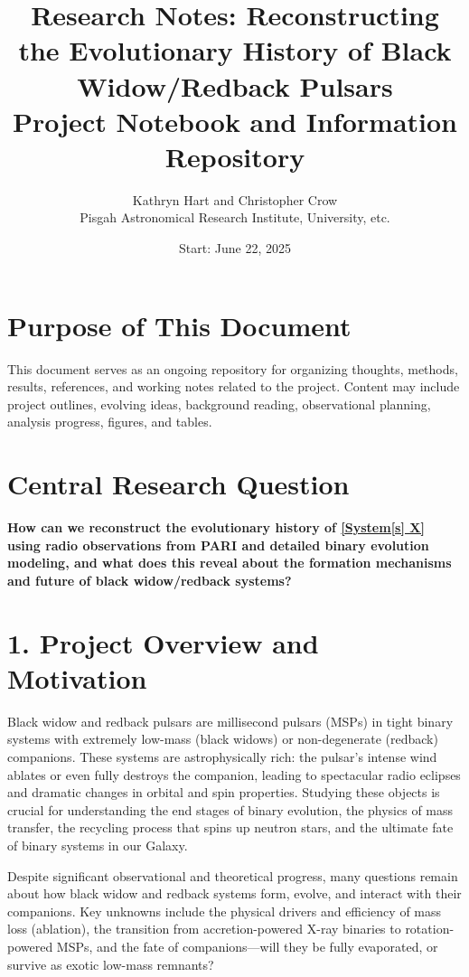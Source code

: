 \documentclass[12pt]{article}
\title{\textbf{Research Notes: Reconstructing the Evolutionary History of Black Widow/Redback Pulsars}\\[1em]
\large{Project Notebook and Information Repository}}
\author{Kathryn Hart and Christopher Crow \\ \small{Pisgah Astronomical Research Institute, University, etc.}}
\date{Start: June 22, 2025}
\begin{document}
\maketitle

\section*{Purpose of This Document}
This document serves as an ongoing repository for organizing thoughts, methods, results, references, and working notes related to the project. Content may include project outlines, evolving ideas, background reading, observational planning, analysis progress, figures, and tables.

\section*{Central Research Question}
\textbf{How can we reconstruct the evolutionary history of \underline{[System[s] X]} using radio observations from PARI and detailed binary evolution modeling, and what does this reveal about the formation mechanisms and future of black widow/redback systems?}

\section*{1. Project Overview and Motivation}

Black widow and redback pulsars are millisecond pulsars (MSPs) in tight binary systems with extremely low-mass (black widows) or non-degenerate (redback) companions. These systems are astrophysically rich: the pulsar's intense wind ablates or even fully destroys the companion, leading to spectacular radio eclipses and dramatic changes in orbital and spin properties. Studying these objects is crucial for understanding the end stages of binary evolution, the physics of mass transfer, the recycling process that spins up neutron stars, and the ultimate fate of binary systems in our Galaxy.

\vspace{1em}

Despite significant observational and theoretical progress, many questions remain about how black widow and redback systems form, evolve, and interact with their companions. Key unknowns include the physical drivers and efficiency of mass loss (ablation), the transition from accretion-powered X-ray binaries to rotation-powered MSPs, and the fate of companions—will they be fully evaporated, or survive as exotic low-mass remnants?
\end{document}
